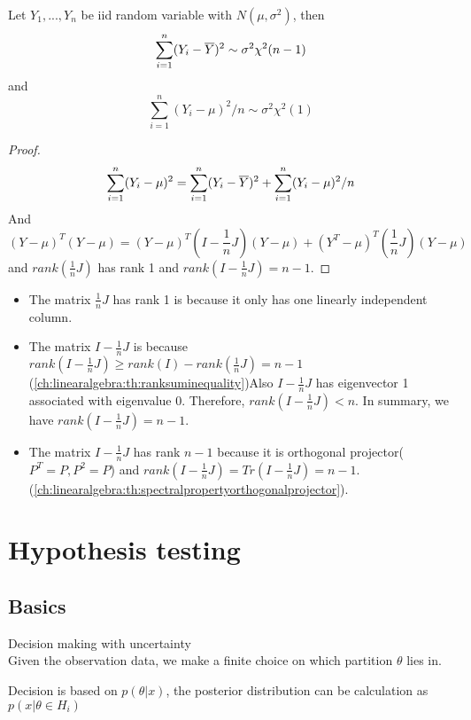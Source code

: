 \begin{refsection}
\begin{corollary}\label{ch:theory-of-statistics:th:samplevariancedistribution}
	Let $Y_1,...,Y_n$ be iid random variable with $N(\mu,\sigma^2)$, then
	$$\sum_{i=1}^n (Y_i - \overline{Y})^2 \sim \sigma^2 \chi^2(n-1)$$
	and
	$$\sum_{i=1}^n (Y_i - \mu)^2/n \sim \sigma^2 \chi^2(1)$$
\end{corollary}
\begin{proof}
	$$\sum_{i=1}^n (Y_i- \mu)^2 = \sum_{i=1}^n (Y_i - \overline{Y})^2 + \sum_{i=1}^n (Y_i - \mu)^2/n$$
	And
	$$(Y-\mu)^T(Y-\mu) = (Y-\mu)^T(I - \frac{1}{n}J)(Y-\mu) + (Y^T-\mu)^T(\frac{1}{n}J)(Y-\mu)$$
	and $rank(\frac{1}{n}J)$ has rank 1 and $rank(I - \frac{1}{n}J) = n-1$.
\end{proof}


\begin{remark}\hfill
	\begin{itemize}
		\item The matrix $\frac{1}{n}J$ has rank 1 is because it only has one linearly independent column.
		\item The matrix $I - \frac{1}{n}J$ is because
		$rank(I - \frac{1}{n}J) \geq rank(I) - rank(\frac{1}{n}J) = n-1$(\autoref{ch:linearalgebra:th:ranksuminequality})Also  $I - \frac{1}{n}J$ has eigenvector 1 associated with eigenvalue 0. Therefore, $rank(I - \frac{1}{n}J) < n$. In summary, we have $rank(I - \frac{1}{n}J)=n-1$.
		\item The matrix $I -  \frac{1}{n}J$ has rank $n-1$ because it is orthogonal projector($P^T=P,P^2=P$) and $rank(I -  \frac{1}{n}J)=Tr(I -  \frac{1}{n}J) = n-1$.(\autoref{ch:linearalgebra:th:spectralpropertyorthogonalprojector}).
	\end{itemize}
\end{remark}


\section{Hypothesis testing}
\subsection{Basics}
\begin{mdframed}
	Decision making with uncertainty\\
	Given the observation data, we make a finite choice on which partition  $\theta$ lies in. 
	
	Decision is based on $p(\theta|x)$, the posterior distribution can be calculation as $p(x|\theta \in H_i)$\\
	

\end{mdframed}
\end{refsection}
